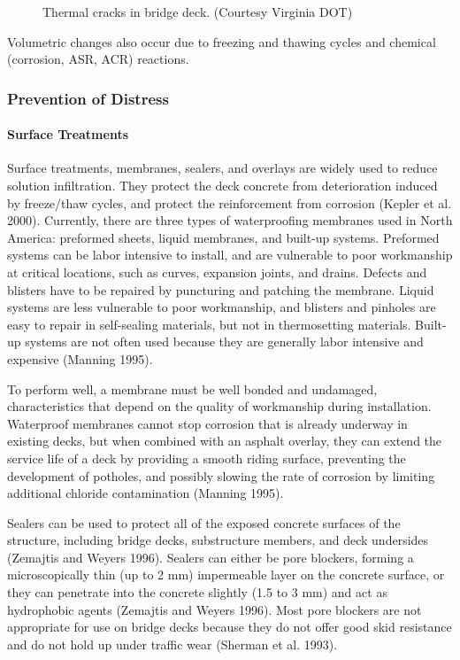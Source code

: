 \begin{figure}
  \caption{Thermal cracks in bridge deck. (Courtesy Virginia DOT)}\label{fig:thermal-cracks}
\end{figure}

Volumetric changes also occur due to freezing and thawing cycles and chemical (corrosion, ASR, ACR) reactions.

\subsubsection{Prevention of Distress}
\paragraph{Surface Treatments}
Surface treatments, membranes, sealers, and overlays are widely used to reduce solution infiltration. They
protect the deck concrete from deterioration induced by freeze/thaw cycles, and protect the reinforcement from
corrosion (Kepler et al. 2000). Currently, there are three types of waterproofing membranes used in North America:
preformed sheets, liquid membranes, and built-up systems. Preformed systems can be labor intensive to install, and
are vulnerable to poor workmanship at critical locations, such as curves, expansion joints, and drains. Defects and
blisters have to be repaired by puncturing and patching the membrane. Liquid systems are less vulnerable to poor
workmanship, and blisters and pinholes are easy to repair in self-sealing materials, but not in thermosetting materials.
Built-up systems are not often used because they are generally labor intensive and expensive (Manning 1995).

To perform well, a membrane must be well bonded and undamaged, characteristics that depend on the quality of
workmanship during installation. Waterproof membranes cannot stop corrosion that is already underway in existing
decks, but when combined with an asphalt overlay, they can extend the service life of a deck by providing a smooth
riding surface, preventing the development of potholes, and possibly slowing the rate of corrosion by limiting
additional chloride contamination (Manning 1995).

Sealers can be used to protect all of the exposed concrete surfaces of the structure, including bridge decks,
substructure members, and deck undersides (Zemajtis and Weyers 1996). Sealers can either be pore blockers,
forming a microscopically thin (up to 2 mm) impermeable layer on the concrete surface, or they can penetrate into
the concrete slightly (1.5 to 3 mm) and act as hydrophobic agents (Zemajtis and Weyers 1996). Most pore blockers
are not appropriate for use on bridge decks because they do not offer good skid resistance and do not hold up under
traffic wear (Sherman et al. 1993).

